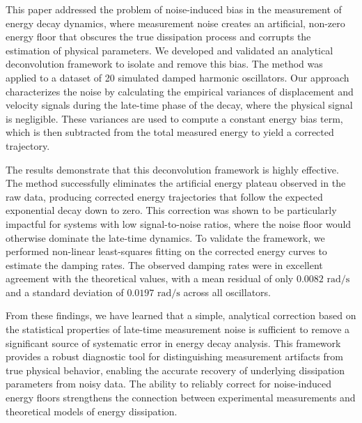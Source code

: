 \documentclass[]{article}
\begin{document}
This paper addressed the problem of noise-induced bias in the measurement of energy decay dynamics, where measurement noise creates an artificial, non-zero energy floor that obscures the true dissipation process and corrupts the estimation of physical parameters. We developed and validated an analytical deconvolution framework to isolate and remove this bias. The method was applied to a dataset of 20 simulated damped harmonic oscillators. Our approach characterizes the noise by calculating the empirical variances of displacement and velocity signals during the late-time phase of the decay, where the physical signal is negligible. These variances are used to compute a constant energy bias term, which is then subtracted from the total measured energy to yield a corrected trajectory.

The results demonstrate that this deconvolution framework is highly effective. The method successfully eliminates the artificial energy plateau observed in the raw data, producing corrected energy trajectories that follow the expected exponential decay down to zero. This correction was shown to be particularly impactful for systems with low signal-to-noise ratios, where the noise floor would otherwise dominate the late-time dynamics. To validate the framework, we performed non-linear least-squares fitting on the corrected energy curves to estimate the damping rates. The observed damping rates were in excellent agreement with the theoretical values, with a mean residual of only $0.0082 \text{ rad/s}$ and a standard deviation of $0.0197 \text{ rad/s}$ across all oscillators.

From these findings, we have learned that a simple, analytical correction based on the statistical properties of late-time measurement noise is sufficient to remove a significant source of systematic error in energy decay analysis. This framework provides a robust diagnostic tool for distinguishing measurement artifacts from true physical behavior, enabling the accurate recovery of underlying dissipation parameters from noisy data. The ability to reliably correct for noise-induced energy floors strengthens the connection between experimental measurements and theoretical models of energy dissipation.
\end{document}

